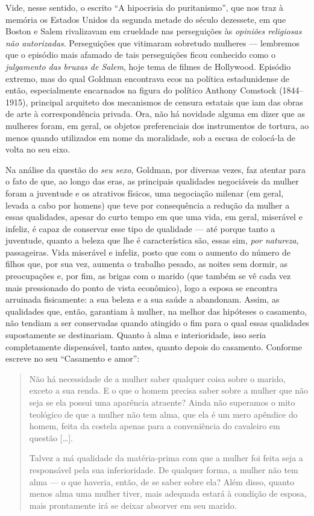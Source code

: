 Vide, nesse sentido, o escrito ``A
hipocrisia do puritanismo'', que nos traz à memória os Estados Unidos da
segunda metade do século dezessete, em que Boston e Salem rivalizavam em
crueldade nas perseguições às \textit{opiniões religiosas não autorizadas}. 
Perseguições que vitimaram sobretudo mulheres --- lembremos que o
episódio mais afamado de tais perseguições ficou conhecido como o
\textit{julgamento das bruxas de Salem}, hoje tema de filmes de Hollywood.
Episódio extremo, mas do qual Goldman encontrava ecos na política
estadunidense de então, especialmente encarnados na figura do político
Anthony Comstock (1844--1915), principal arquiteto dos mecanismos de
censura estatais que iam das obras de arte à correspondência privada.
Ora, não há novidade alguma em dizer que as mulheres foram, em geral, os
objetos preferenciais dos instrumentos de tortura, ao menos quando
utilizados em nome da moralidade, sob a escusa de colocá-la de volta no
seu eixo.

Na análise da questão do \textit{seu sexo}, Goldman, por diversas vezes, faz
atentar para o fato de que, ao longo das eras, as principais qualidades
negociáveis da mulher foram a juventude e os atrativos físicos, uma
negociação milenar (em geral, levada a cabo por homens) que teve por
consequência a redução da mulher a essas qualidades, apesar do curto
tempo em que uma vida, em geral, miserável e infeliz, é capaz de
conservar esse tipo de qualidade --- até porque tanto a juventude, quanto
a beleza que lhe é característica são, essas sim, \textit{por natureza},
passageiras. Vida miserável e infeliz, posto que com o aumento do número
de filhos que, por sua vez, aumenta o trabalho pesado, as noites sem
dormir, as preocupações e, por fim, as brigas com o marido (que também
se vê cada vez mais pressionado do ponto de vista econômico), logo a
esposa se encontra arruinada fisicamente: a sua beleza e a sua saúde a
abandonam. Assim, as qualidades que, então, garantiam à mulher, na
melhor das hipóteses o casamento, não tendiam a ser conservadas quando
atingido o fim para o qual essas qualidades supostamente se destinariam.
Quanto à alma e interioridade, isso seria completamente dispensável,
tanto antes, quanto depois do casamento. Conforme escreve no seu
``Casamento e amor'':

\begin{quote}
Não há necessidade de a mulher saber qualquer coisa sobre o marido,
exceto a sua renda. E o que o homem precisa saber sobre a mulher que não
seja se ela possui uma aparência atraente? Ainda não superamos o mito
teológico de que a mulher não tem alma, que ela é um mero apêndice do
homem, feita da costela apenas para a conveniência do cavaleiro em
questão {[}\ldots{]}.

Talvez a má qualidade da matéria-prima com que a mulher foi feita seja a
responsável pela sua inferioridade. De qualquer forma, a mulher não tem
alma --- o que haveria, então, de se saber sobre ela? Além disso, quanto
menos alma uma mulher tiver, mais adequada estará à condição de esposa,
mais prontamente irá se deixar absorver em seu marido.
\end{quote}

